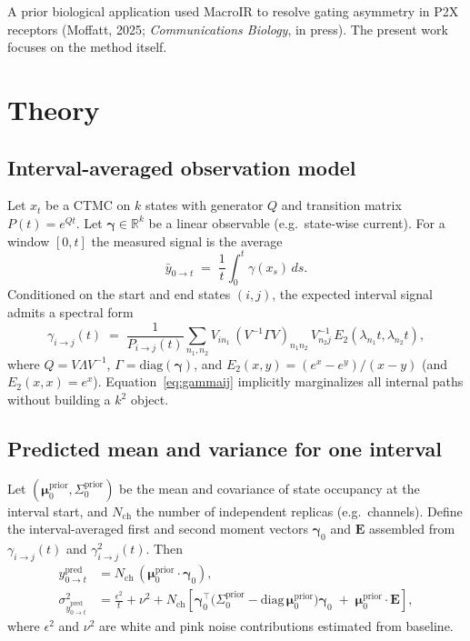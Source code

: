\documentclass[9pt]{elife}
\begin{document}
A prior biological application used MacroIR to resolve gating asymmetry in P2X receptors (Moffatt, 2025; \emph{Communications Biology}, in press). The present work focuses on the method itself.

\section*{Theory}
\subsection*{Interval-averaged observation model}
Let $x_t$ be a CTMC on $k$ states with generator $Q$ and transition matrix $P(t)=e^{Qt}$. Let $\bm{\gamma}\in\mathbb{R}^k$ be a linear observable (e.g.\ state-wise current). For a window $[0,t]$ the measured signal is the average
\begin{equation}
\bar y_{0\to t} \;=\; \frac{1}{t}\int_0^t \gamma(x_s)\,ds.
\end{equation}
Conditioned on the start and end states $(i,j)$, the expected interval signal admits a spectral form
\begin{equation}
\label{eq:gammaij}
\gamma_{i\to j}(t) \;=\; \frac{1}{P_{i\to j}(t)} \sum_{n_1,n_2} V_{i n_1}\,(V^{-1}\Gamma V)_{n_1 n_2}\,V^{-1}_{n_2 j}\,E_2(\lambda_{n_1} t, \lambda_{n_2} t),
\end{equation}
where $Q=V\Lambda V^{-1}$, $\Gamma=\mathrm{diag}(\bm{\gamma})$, and $E_2(x,y)=(e^{x}-e^{y})/(x-y)$ (and $E_2(x,x)=e^x$). Equation~\eqref{eq:gammaij} implicitly marginalizes all internal paths without building a $k^2$ object.

\subsection*{Predicted mean and variance for one interval}
Let $(\bm{\mu}^{\mathrm{prior}}_0,\Sigma^{\mathrm{prior}}_0)$ be the mean and covariance of state occupancy at the interval start, and $N_{\mathrm{ch}}$ the number of independent replicas (e.g.\ channels). Define the interval-averaged first and second moment vectors $\bm{\gamma}_0$ and $\mathbf{E}$ assembled from $\gamma_{i\to j}(t)$ and $\gamma_{i\to j}^2(t)$. Then
\begin{align}
y^{\mathrm{pred}}_{0\to t} &= N_{\mathrm{ch}}\,(\bm{\mu}^{\mathrm{prior}}_0 \cdot \bm{\gamma}_0),\\
\sigma^2_{y^{\mathrm{pred}}_{0\to t}} &= \frac{\epsilon^2}{t} + \nu^2 + N_{\mathrm{ch}}\left[\bm{\gamma}_0^\top\!\big(\Sigma^{\mathrm{prior}}_0 - \mathrm{diag}\,\bm{\mu}^{\mathrm{prior}}_0\big)\bm{\gamma}_0 \;+\; \bm{\mu}^{\mathrm{prior}}_0 \cdot \mathbf{E}\right],
\end{align}
where $\epsilon^2$ and $\nu^2$ are white and pink noise contributions estimated from baseline.
\end{document}
